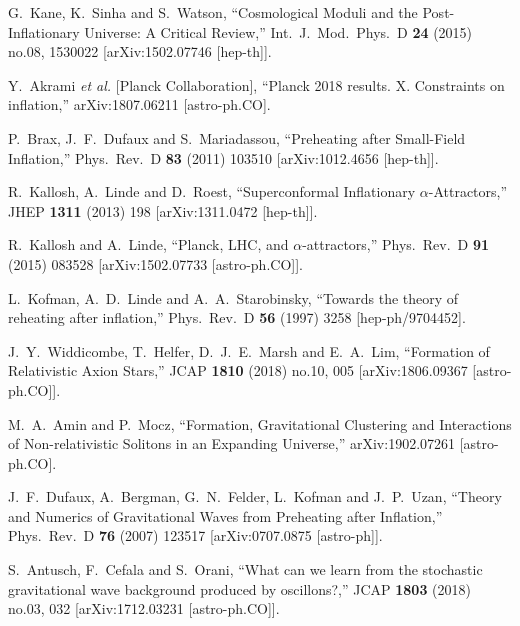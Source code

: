 \documentclass[11pt,a4paper]{article}
\begin{document}
\begin{thebibliography}{99}
  G.~Kane, K.~Sinha and S.~Watson,
  ``Cosmological Moduli and the Post-Inflationary Universe: A Critical Review,''
  Int.\ J.\ Mod.\ Phys.\ D {\bf 24} (2015) no.08,  1530022
  [arXiv:1502.07746 [hep-th]].
  
  Y.~Akrami {\it et al.} [Planck Collaboration],
  ``Planck 2018 results. X. Constraints on inflation,''
  arXiv:1807.06211 [astro-ph.CO].
  
  P.~Brax, J.~F.~Dufaux and S.~Mariadassou,
  ``Preheating after Small-Field Inflation,''
  Phys.\ Rev.\ D {\bf 83} (2011) 103510
  [arXiv:1012.4656 [hep-th]].
  
  R.~Kallosh, A.~Linde and D.~Roest,
  ``Superconformal Inflationary $\alpha$-Attractors,''
  JHEP {\bf 1311} (2013) 198
  [arXiv:1311.0472 [hep-th]].
  
  R.~Kallosh and A.~Linde,
  ``Planck, LHC, and $\alpha$-attractors,''
  Phys.\ Rev.\ D {\bf 91} (2015) 083528
  [arXiv:1502.07733 [astro-ph.CO]].
  
  L.~Kofman, A.~D.~Linde and A.~A.~Starobinsky,
  ``Towards the theory of reheating after inflation,''
  Phys.\ Rev.\ D {\bf 56} (1997) 3258
  [hep-ph/9704452].
  
  J.~Y.~Widdicombe, T.~Helfer, D.~J.~E.~Marsh and E.~A.~Lim,
  ``Formation of Relativistic Axion Stars,''
  JCAP {\bf 1810} (2018) no.10,  005
  [arXiv:1806.09367 [astro-ph.CO]].
  
M.~A.~Amin and P.~Mocz,
  ``Formation, Gravitational Clustering and Interactions of Non-relativistic Solitons in an Expanding Universe,''
arXiv:1902.07261 [astro-ph.CO].

  J.~F.~Dufaux, A.~Bergman, G.~N.~Felder, L.~Kofman and J.~P.~Uzan,
  ``Theory and Numerics of Gravitational Waves from Preheating after Inflation,''
  Phys.\ Rev.\ D {\bf 76} (2007) 123517
  [arXiv:0707.0875 [astro-ph]].
  
  S.~Antusch, F.~Cefala and S.~Orani,
  ``What can we learn from the stochastic gravitational wave background produced by oscillons?,''
  JCAP {\bf 1803} (2018) no.03,  032
  [arXiv:1712.03231 [astro-ph.CO]].
  

\end{thebibliography}
\end{document}
